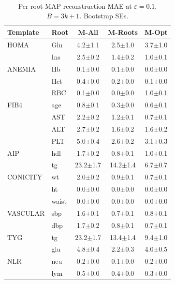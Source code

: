 \providecommand{\pmstd}[1]{{\scriptsize $\pm$#1}}

\begin{table}[t]
\centering\footnotesize
\caption{Per-root MAP reconstruction MAE at $\varepsilon=0.1$, $B=3k{+}1$. Bootstrap SEs.}
\label{tab:agent_per_root_mae}
\begin{tabular}{l|l|ccc}
\toprule
Template & Root & M-All & M-Roots & M-Opt \\
\midrule
HOMA & Glu & 4.2\pmstd{1.1} & 2.5\pmstd{1.0} & 3.7\pmstd{1.0} \\
 & Ins & 2.5\pmstd{0.2} & 1.4\pmstd{0.2} & 1.0\pmstd{0.1} \\
\midrule
ANEMIA & Hb & 0.1\pmstd{0.0} & 0.1\pmstd{0.0} & 0.0\pmstd{0.0} \\
 & Hct & 0.4\pmstd{0.0} & 0.2\pmstd{0.0} & 0.1\pmstd{0.0} \\
 & RBC & 0.1\pmstd{0.0} & 0.0\pmstd{0.0} & 1.0\pmstd{0.1} \\
\midrule
FIB4 & age & 0.8\pmstd{0.1} & 0.3\pmstd{0.0} & 0.6\pmstd{0.1} \\
 & AST & 2.2\pmstd{0.2} & 1.2\pmstd{0.1} & 0.7\pmstd{0.1} \\
 & ALT & 2.7\pmstd{0.2} & 1.6\pmstd{0.2} & 1.6\pmstd{0.2} \\
 & PLT & 5.0\pmstd{0.4} & 2.6\pmstd{0.2} & 3.1\pmstd{0.3} \\
\midrule
AIP & hdl & 1.7\pmstd{0.2} & 0.8\pmstd{0.1} & 1.0\pmstd{0.1} \\
 & tg & 23.2\pmstd{1.7} & 14.2\pmstd{1.4} & 6.7\pmstd{0.7} \\
\midrule
CONICITY & wt & 2.0\pmstd{0.2} & 0.9\pmstd{0.1} & 0.7\pmstd{0.1} \\
 & ht & 0.0\pmstd{0.0} & 0.0\pmstd{0.0} & 0.0\pmstd{0.0} \\
 & waist & 0.0\pmstd{0.0} & 0.0\pmstd{0.0} & 0.0\pmstd{0.0} \\
\midrule
VASCULAR & sbp & 1.6\pmstd{0.1} & 0.7\pmstd{0.1} & 0.8\pmstd{0.1} \\
 & dbp & 1.7\pmstd{0.2} & 0.8\pmstd{0.1} & 0.7\pmstd{0.1} \\
\midrule
TYG & tg & 23.2\pmstd{1.7} & 13.4\pmstd{1.4} & 9.4\pmstd{1.0} \\
 & glu & 4.8\pmstd{0.4} & 2.2\pmstd{0.3} & 4.0\pmstd{0.5} \\
\midrule
NLR & neu & 0.2\pmstd{0.0} & 0.1\pmstd{0.0} & 0.2\pmstd{0.0} \\
 & lym & 0.5\pmstd{0.0} & 0.4\pmstd{0.0} & 0.3\pmstd{0.0} \\
\bottomrule
\end{tabular}
\end{table}
